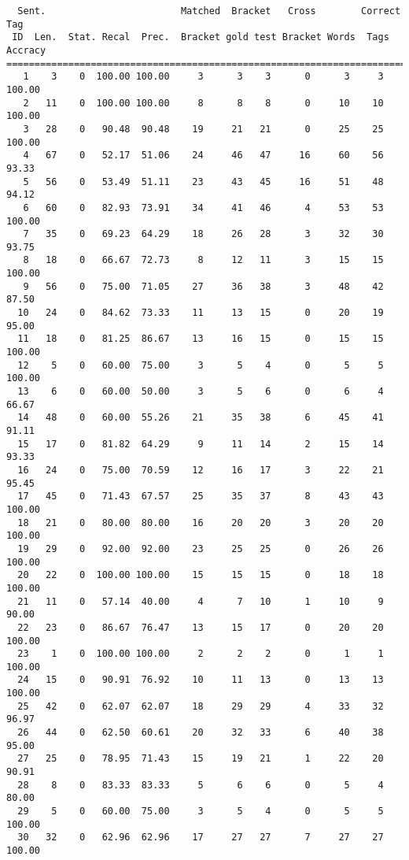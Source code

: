 \scriptsize
\begin{verbatim}
  Sent.                        Matched  Bracket   Cross        Correct Tag
 ID  Len.  Stat. Recal  Prec.  Bracket gold test Bracket Words  Tags Accracy
============================================================================
   1    3    0  100.00 100.00     3      3    3      0      3     3   100.00
   2   11    0  100.00 100.00     8      8    8      0     10    10   100.00
   3   28    0   90.48  90.48    19     21   21      0     25    25   100.00
   4   67    0   52.17  51.06    24     46   47     16     60    56    93.33
   5   56    0   53.49  51.11    23     43   45     16     51    48    94.12
   6   60    0   82.93  73.91    34     41   46      4     53    53   100.00
   7   35    0   69.23  64.29    18     26   28      3     32    30    93.75
   8   18    0   66.67  72.73     8     12   11      3     15    15   100.00
   9   56    0   75.00  71.05    27     36   38      3     48    42    87.50
  10   24    0   84.62  73.33    11     13   15      0     20    19    95.00
  11   18    0   81.25  86.67    13     16   15      0     15    15   100.00
  12    5    0   60.00  75.00     3      5    4      0      5     5   100.00
  13    6    0   60.00  50.00     3      5    6      0      6     4    66.67
  14   48    0   60.00  55.26    21     35   38      6     45    41    91.11
  15   17    0   81.82  64.29     9     11   14      2     15    14    93.33
  16   24    0   75.00  70.59    12     16   17      3     22    21    95.45
  17   45    0   71.43  67.57    25     35   37      8     43    43   100.00
  18   21    0   80.00  80.00    16     20   20      3     20    20   100.00
  19   29    0   92.00  92.00    23     25   25      0     26    26   100.00
  20   22    0  100.00 100.00    15     15   15      0     18    18   100.00
  21   11    0   57.14  40.00     4      7   10      1     10     9    90.00
  22   23    0   86.67  76.47    13     15   17      0     20    20   100.00
  23    1    0  100.00 100.00     2      2    2      0      1     1   100.00
  24   15    0   90.91  76.92    10     11   13      0     13    13   100.00
  25   42    0   62.07  62.07    18     29   29      4     33    32    96.97
  26   44    0   62.50  60.61    20     32   33      6     40    38    95.00
  27   25    0   78.95  71.43    15     19   21      1     22    20    90.91
  28    8    0   83.33  83.33     5      6    6      0      5     4    80.00
  29    5    0   60.00  75.00     3      5    4      0      5     5   100.00
  30   32    0   62.96  62.96    17     27   27      7     27    27   100.00

\end{verbatim}

